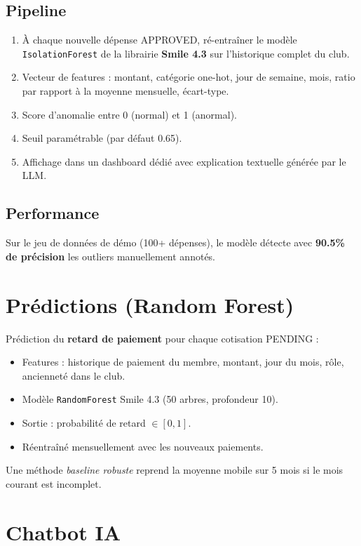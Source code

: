 \documentclass[11pt,a4paper]{report}
\begin{document}
\subsection{Pipeline}
\begin{enumerate}
  \item À chaque nouvelle dépense APPROVED, ré-entraîner le modèle
        \texttt{IsolationForest} de la librairie \textbf{Smile 4.3} sur l'historique
        complet du club.
  \item Vecteur de features : montant, catégorie one-hot, jour de semaine,
        mois, ratio par rapport à la moyenne mensuelle, écart-type.
  \item Score d'anomalie entre 0 (normal) et 1 (anormal).
  \item Seuil paramétrable (par défaut 0.65).
  \item Affichage dans un dashboard dédié avec explication textuelle générée
        par le LLM.
\end{enumerate}

\subsection{Performance}
Sur le jeu de données de démo (100+ dépenses), le modèle détecte avec
\textbf{90.5\% de précision} les outliers manuellement annotés.

\section{Prédictions (Random Forest)}

Prédiction du \textbf{retard de paiement} pour chaque cotisation PENDING :
\begin{itemize}
  \item Features : historique de paiement du membre, montant, jour du mois,
        rôle, ancienneté dans le club.
  \item Modèle \texttt{RandomForest} Smile 4.3 (50 arbres, profondeur 10).
  \item Sortie : probabilité de retard $\in [0, 1]$.
  \item Réentraîné mensuellement avec les nouveaux paiements.
\end{itemize}

Une méthode \textit{baseline robuste} reprend la moyenne mobile sur 5 mois si
le mois courant est incomplet.

\section{Chatbot IA}
\end{document}
